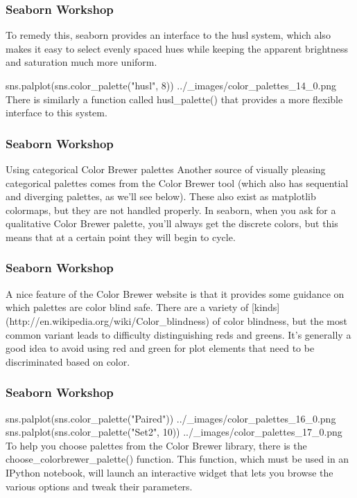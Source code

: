 
\begin{frame}[fragile]
\frametitle{Seaborn Workshop}
\large

To remedy this, seaborn provides an interface to the husl system, which also makes it easy to select evenly spaced hues while keeping the apparent brightness and saturation much more uniform.

sns.palplot(sns.color_palette("husl", 8))
../_images/color_palettes_14_0.png
There is similarly a function called husl_palette() that provides a more flexible interface to this system.
\end{frame}
\begin{frame}[fragile]
	\frametitle{Seaborn Workshop}
	\large
Using categorical Color Brewer palettes
Another source of visually pleasing categorical palettes comes from the Color Brewer tool (which also has sequential and diverging palettes, as we’ll see below). These also exist as matplotlib colormaps, but they are not handled properly. In seaborn, when you ask for a qualitative Color Brewer palette, you’ll always get the discrete colors, but this means that at a certain point they will begin to cycle.
\end{frame}
\begin{frame}[fragile]
	\frametitle{Seaborn Workshop}
	\large
A nice feature of the Color Brewer website is that it provides some guidance on which palettes are color blind safe. There are a variety of [kinds](http://en.wikipedia.org/wiki/Color_blindness) of color blindness, but the most common variant leads to difficulty distinguishing reds and greens. It’s generally a good idea to avoid using red and green for plot elements that need to be discriminated based on color.
\end{frame}
\begin{frame}[fragile]
	\frametitle{Seaborn Workshop}
	\large

sns.palplot(sns.color_palette("Paired"))
../_images/color_palettes_16_0.png
sns.palplot(sns.color_palette("Set2", 10))
../_images/color_palettes_17_0.png
To help you choose palettes from the Color Brewer library, there is the choose_colorbrewer_palette() function. This function, which must be used in an IPython notebook, will launch an interactive widget that lets you browse the various options and tweak their parameters.
\end{frame}
